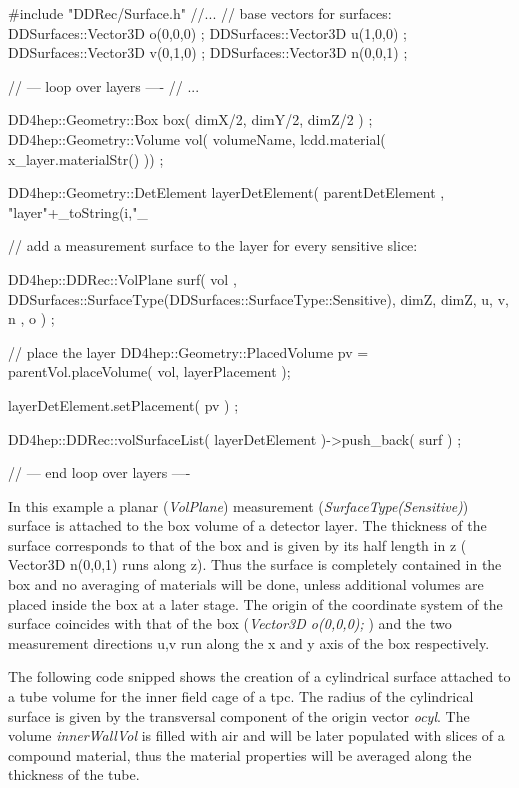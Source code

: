 \documentclass[10pt,a4paper]{article}
\begin{document}
\begin{code}
  #include "DDRec/Surface.h"
  //...
  // base vectors for surfaces:
  DDSurfaces::Vector3D o(0,0,0) ;
  DDSurfaces::Vector3D u(1,0,0) ;
  DDSurfaces::Vector3D v(0,1,0) ;
  DDSurfaces::Vector3D n(0,0,1) ;

  // --- loop over layers ----
  // ...

    DD4hep::Geometry::Box  box( dimX/2, dimY/2, dimZ/2 ) ;
    DD4hep::Geometry::Volume vol( volumeName, lcdd.material( x_layer.materialStr() )) ;

    DD4hep::Geometry::DetElement layerDetElement( parentDetElement , "layer"+_toString(i,"_%

    // add a measurement surface to the layer for every sensitive slice:

    DD4hep::DDRec::VolPlane surf( vol , 
                          DDSurfaces::SurfaceType(DDSurfaces::SurfaceType::Sensitive),
                          dimZ, dimZ, 
                          u, v, n , o ) ; 

    // place the layer
    DD4hep::Geometry::PlacedVolume pv = parentVol.placeVolume(  vol, layerPlacement );

    layerDetElement.setPlacement( pv ) ;

    DD4hep::DDRec::volSurfaceList( layerDetElement )->push_back( surf ) ;

  // --- end loop over layers ----

\end{code}
In this example a planar ({\em VolPlane}) measurement ({\em SurfaceType(Sensitive)})
surface is attached to the box volume of a detector layer.
The thickness of the surface corresponds to that of the box and is given by its half length in z
( Vector3D n(0,0,1) runs along z). Thus the surface is completely contained in 
the box and no averaging of materials will be done, unless additional volumes
are placed inside the box at a later stage. 
The origin of the coordinate system of the surface coincides with that of the box
({\em Vector3D o(0,0,0); })
and the two measurement directions u,v run along the x and y axis of the box
respectively.

\noindent
The following code snipped shows the creation of a cylindrical surface attached
to a tube volume for the inner field cage of a tpc. The radius of the cylindrical
surface is given by the transversal component of the origin vector {\em ocyl}.
The volume {\em innerWallVol} is filled with air and will be later populated
with slices of a compound material, thus the material properties will be
averaged along the thickness of the tube.
\end{document}
